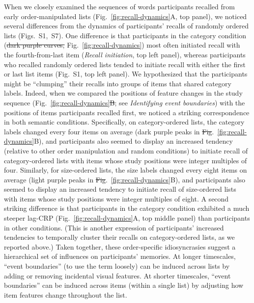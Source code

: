 \documentclass[11pt]{article}
\newcommand{\dynamicsRandom}{S1}
\newcommand{\recallInit}{S7}
\providecommand{\DIFaddtex}[1]{{\protect\color{blue}\uwave{#1}}} %
\providecommand{\DIFdeltex}[1]{{\protect\color{red}\sout{#1}}}                      %
\providecommand{\DIFaddbegin}{} %
\providecommand{\DIFaddend}{} %
\providecommand{\DIFdelbegin}{} %
\providecommand{\DIFdelend}{} %
\providecommand{\DIFadd}[1]{\texorpdfstring{\DIFaddtex{#1}}{#1}} %
\providecommand{\DIFdel}[1]{\texorpdfstring{\DIFdeltex{#1}}{}} %
\newcommand{\DIFscaledelfig}{0.5}
\newlength{\DIFdelgraphicswidth} %
\newlength{\DIFdelgraphicsheight} %
\newcommand{\DIFaddincludegraphics}[2][]{{\color{blue}\fbox{\DIFOincludegraphics[#1]{#2}}}} %
\newcommand{\DIFdelincludegraphics}[2][]{%
\sbox{\DIFdelgraphicsbox}{\DIFOincludegraphics[#1]{#2}}%
\settoboxwidth{\DIFdelgraphicswidth}{\DIFdelgraphicsbox} %
\settoboxtotalheight{\DIFdelgraphicsheight}{\DIFdelgraphicsbox} %
\scalebox{\DIFscaledelfig}{%
\parbox[b]{\DIFdelgraphicswidth}{\usebox{\DIFdelgraphicsbox}\\[-\baselineskip] \rule{\DIFdelgraphicswidth}{0em}}\llap{\resizebox{\DIFdelgraphicswidth}{\DIFdelgraphicsheight}{%
\setlength{\unitlength}{\DIFdelgraphicswidth}%
\begin{picture}(1,1)%
\thicklines\linethickness{2pt} %
{\color[rgb]{1,0,0}\put(0,0){\framebox(1,1){}}}%
{\color[rgb]{1,0,0}\put(0,0){\line( 1,1){1}}}%
{\color[rgb]{1,0,0}\put(0,1){\line(1,-1){1}}}%
\end{picture}%
}\hspace*{3pt}}} %
} %
\DeclareRobustCommand{\DIFaddbegin}{\DIFOaddbegin \let\includegraphics\DIFaddincludegraphics} %
\DeclareRobustCommand{\DIFaddend}{\DIFOaddend \let\includegraphics\DIFOincludegraphics} %
\DeclareRobustCommand{\DIFdelbegin}{\DIFOdelbegin \let\includegraphics\DIFdelincludegraphics} %
\DeclareRobustCommand{\DIFdelend}{\DIFOaddend \let\includegraphics\DIFOincludegraphics} %
\begin{document}
When we closely examined the sequences of words participants recalled from
early order-manipulated lists (Fig.~\ref{fig:recall-dynamics}A, top panel), we
noticed several differences from the dynamics of participants' recalls of
randomly ordered lists (Figs.~\dynamicsRandom,~\recallInit). One difference is
that participants in the category condition (\DIFdelbegin \DIFdel{dark purple curves,
}\DIFdelend Fig.~\ref{fig:recall-dynamics}\DIFaddbegin \DIFadd{,
dark purple curves}\DIFaddend ) most often initiated recall with the
fourth-from-last item (\textit{Recall initiation}, top left panel), whereas
participants who recalled randomly ordered lists tended to initiate recall with
either the first or last list items (Fig.~\dynamicsRandom, top left panel). We
hypothesized that the participants might be ``clumping'' their recalls into
groups of items that shared category labels. Indeed, when we compared the
positions of feature changes in the study sequence
(Fig.~\ref{fig:recall-dynamics}\DIFdelbegin \DIFdel{B}\DIFdelend \DIFaddbegin \DIFadd{C}\DIFaddend ; see \textit{Identifying event boundaries})
with the positions of items participants recalled first, we noticed a striking
correspondence in both semantic conditions. Specifically, on category-ordered
lists, the category labels changed every four items on average (dark purple
peaks in \DIFdelbegin \DIFdel{Fig}\DIFdelend \DIFaddbegin \DIFadd{Figs}\DIFaddend .~\ref{fig:recall-dynamics}B\DIFaddbegin \DIFadd{, C}\DIFaddend ), and participants also seemed to
display an increased tendency (relative to other order manipulation and random
conditions) to initiate recall of category-ordered lists with items whose study
positions were integer multiples of four. Similarly, for size-ordered lists,
the size labels changed every eight items on average (light purple peaks in
\DIFdelbegin \DIFdel{Fig}\DIFdelend \DIFaddbegin \DIFadd{Figs}\DIFaddend .~\ref{fig:recall-dynamics}B\DIFaddbegin \DIFadd{, C}\DIFaddend ), and participants also seemed to display an
increased tendency to initiate recall of size-ordered lists with items whose
study positions were integer multiples of eight. A second striking difference
is that participants in the category condition exhibited a much steeper lag-CRP
(Fig.~\ref{fig:recall-dynamics}A, top middle panel) than participants in other
conditions. (This is another expression of participants' increased tendencies
to temporally cluster their recalls on category-ordered lists, as we reported
above.) Taken together, these order-specific idiosyncrasies suggest a
hierarchical set of influences on participants' memories. At longer timescales,
``event boundaries'' (to use the term loosely) can be induced across lists by
adding or removing incidental visual features. At shorter timescales, ``event
boundaries'' can be induced across items (within a single list) by adjusting
how item features change throughout the list.
\end{document}
